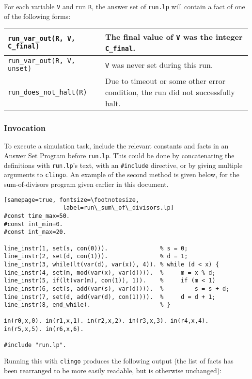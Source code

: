 \documentclass[a4paper,twoside,notitlepage,12pt]{article}
\begin{document}
For each variable \verb|V| and run \verb|R|, the answer set of \verb|run.lp| will 
contain a fact of one of the following forms:

\begin{tabularx}{\textwidth}{|l|X|}
\hline
\verb|run_var_out(R, V, C_final)| &
The final value of \verb|V| was the integer \verb|C_final|. \\
\hline
\verb|run_var_out(R, V, unset)| &
\verb|V| was never set during this run. \\
\hline
\verb|run_does_not_halt(R)| &
Due to timeout or some other error condition, the run did not successfully halt. \\
\hline
\end{tabularx}

\subsubsection{Invocation}

To execute a simulation task, include the relevant constants and facts in an Answer Set 
Program before \verb|run.lp|. This could be done by concatenating the definitions with 
\verb|run.lp|'s text, with an \verb|#include| directive, or by giving multiple 
arguments to \verb|clingo|. An example of the second method is given below, for the 
sum-of-divisors program given earlier in this document.

\begin{verbatim}[samepage=true, fontsize=\footnotesize,
                 label=run\_sum\_of\_divisors.lp]
#const time_max=50.
#const int_min=0.
#const int_max=20.

line_instr(1, set(s, con(0))).               % s = 0;
line_instr(2, set(d, con(1))).               % d = 1;
line_instr(3, while(lt(var(d), var(x)), 4)). % while (d < x) {
line_instr(4, set(m, mod(var(x), var(d)))).  %     m = x % d;
line_instr(5, if(lt(var(m), con(1)), 1)).    %     if (m < 1)
line_instr(6, set(s, add(var(s), var(d)))).  %         s = s + d;
line_instr(7, set(d, add(var(d), con(1)))).  %     d = d + 1;
line_instr(8, end_while).                    % }

in(r0,x,0). in(r1,x,1). in(r2,x,2). in(r3,x,3). in(r4,x,4). in(r5,x,5). in(r6,x,6).

#include "run.lp".
\end{verbatim}

Running this with \verb|clingo| produces the following output (the list of facts has 
been rearranged to be more easily readable, but is otherwise unchanged):
\end{document}
